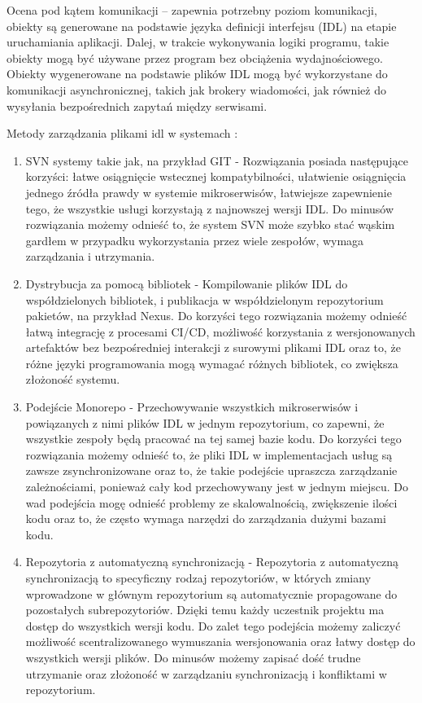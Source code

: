 \documentclass[runningheads,12pt]{llncs}
\begin{document}
Ocena pod kątem komunikacji – zapewnia potrzebny poziom komunikacji, obiekty są generowane na podstawie języka definicji interfejsu (IDL) na etapie uruchamiania aplikacji. Dalej, w trakcie wykonywania logiki programu, takie obiekty mogą być używane przez program bez obciążenia wydajnościowego. Obiekty wygenerowane na podstawie plików IDL mogą być wykorzystane do komunikacji asynchronicznej, takich jak brokery wiadomości, jak również do wysyłania bezpośrednich zapytań między serwisami.

Metody zarządzania plikami idl w systemach :

\begin{enumerate}
    \item SVN systemy takie jak, na przykład GIT - Rozwiązania posiada następujące korzyści: łatwe osiągnięcie wstecznej kompatybilności, ułatwienie osiągnięcia jednego źródła prawdy w systemie mikroserwisów, łatwiejsze zapewnienie tego, że wszystkie usługi korzystają z najnowszej wersji IDL. Do minusów rozwiązania możemy odnieść to, że system SVN może szybko stać wąskim gardłem w przypadku wykorzystania przez wiele zespołów, wymaga zarządzania i utrzymania.
    \item Dystrybucja za pomocą bibliotek - Kompilowanie plików IDL do współdzielonych bibliotek, i publikacja w współdzielonym repozytorium pakietów, na przykład Nexus. Do korzyści tego rozwiązania możemy odnieść łatwą integrację z procesami CI/CD, możliwość korzystania z wersjonowanych artefaktów bez bezpośredniej interakcji z surowymi plikami IDL oraz to, że różne języki programowania mogą wymagać różnych bibliotek, co zwiększa złożoność systemu.
    \item Podejście Monorepo - Przechowywanie wszystkich mikroserwisów i powiązanych z nimi plików IDL w jednym repozytorium, co zapewni, że wszystkie zespoły będą pracować na tej samej bazie kodu. Do korzyści tego rozwiązania możemy odnieść to, że pliki IDL w implementacjach usług są zawsze zsynchronizowane oraz to, że takie podejście upraszcza zarządzanie zależnościami, ponieważ cały kod przechowywany jest w jednym miejscu. Do wad podejścia mogę odnieść problemy ze skalowalnością, zwiększenie ilości kodu oraz to, że często wymaga narzędzi do zarządzania dużymi bazami kodu.
    \item Repozytoria z automatyczną synchronizacją - Repozytoria z automatyczną synchronizacją to specyficzny rodzaj repozytoriów, w których zmiany wprowadzone w głównym repozytorium są automatycznie propagowane do pozostałych subrepozytoriów. Dzięki temu każdy uczestnik projektu ma dostęp do wszystkich wersji kodu. Do zalet tego podejścia możemy zaliczyć możliwość scentralizowanego wymuszania wersjonowania oraz łatwy dostęp do wszystkich wersji plików. Do minusów możemy zapisać dość trudne utrzymanie oraz złożoność w zarządzaniu synchronizacją i konfliktami w repozytorium.

\end{enumerate}
\end{document}
